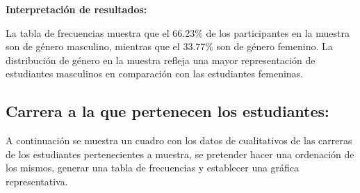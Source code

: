 \documentclass{article}
\begin{document}
\textbf{Interpretación de resultados:}

La tabla de frecuencias muestra que el 66.23\% de los participantes en la muestra son de género masculino, mientras que el 33.77\% son de género femenino. La distribución de género en la muestra refleja una mayor representación de estudiantes masculinos en comparación con las estudiantes femeninas.

\newpage

\subsection{Carrera a la que pertenecen los estudiantes:}

A continuación se muestra un cuadro con los datos de cualitativos de las carreras de los estudiantes pertenecientes a muestra, se pretender hacer una ordenación de los mismos, generar una tabla de frecuencias y establecer una gráfica representativa.
\end{document}
